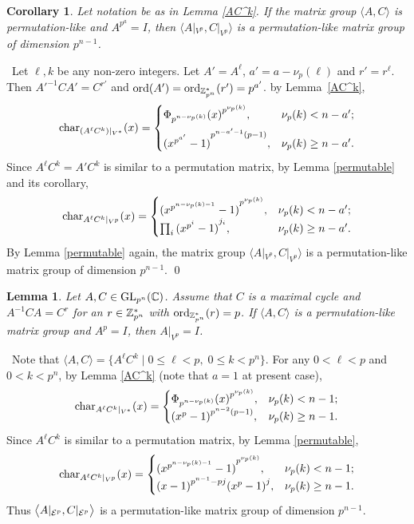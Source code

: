 \documentclass{article}
\newtheorem{corollary}[theorem]{Corollary}
\newtheorem{lemma}[theorem]{Lemma}
\numberwithin{equation}{section}
\def\pf{\noindent{\bf Proof.}~}
\begin{document}
\begin{corollary}\label{V^p}
Let notation be as in Lemma \ref{AC^k}.
If the matrix group $\langle A,C\rangle$ is permutation-like
and $A^{p^a}=I$,  then $\big\langle A|_{V^p},C|_{V^p}\big\rangle$
is a permutation-like matrix group of dimension $p^{n-1}$.
\end{corollary}

\pf Let $\ell,k$ be any non-zero integers.
Let $A'=A^\ell$, $a'=a-\nu_p(\ell)$ and $r'=r^\ell$.
Then $A'^{-1}CA'=C^{r'}$ and
${\rm ord}(A')={\rm ord}_{{\Bbb Z}_{p^n}^*}(r')=p^{a'}$.
by Lemma~\ref{AC^k},
$${\rm char}_{(A^\ell C^k)|_{V^*}}(x)
=\begin{cases}{\Phi_{p^{n-\nu_p(k)}}(x)}^{p^{\nu_p(k)}}, & \nu_p(k)<n-a';\\[5pt]
 {(x^{p^{a'}}-1)}^{p^{n-a'-1}(p-1)}, &  \nu_p(k)\ge n-a'. \end{cases}
$$
Since $A^\ell C^k=A'C^k$ is similar to a permutation matrix,
by Lemma \ref{permutable} and its corollary,
$$
{\rm char}_{A^\ell C^k|_{V^p}}(x)=\begin{cases}
{(x^{p^{n-\nu_p(k)-1}}-1)}^{p^{\nu_p(k)}}, & \nu_p(k)<n-a';\\
\prod_{i}{(x^{p^i}-1)}^{j_i}, & \nu_p(k)\ge n-a'.
\end{cases}
$$
By Lemma \ref{permutable} again, the matrix group
$\big\langle A|_{V^p},C|_{V^p}\big\rangle$
is a permutation-like matrix group of dimension $p^{n-1}$.
\qed


\begin{lemma} \label{A V^p}
Let $A,C\in{\rm GL}_{p^n}({\Bbb C})$.
Assume that $C$ is a maximal cycle and
$A^{-1}CA=C^r$ for an $r\in{\Bbb Z}_{p^n}^*$
with ${\rm ord}_{{\Bbb Z}_{p^{n}}^*}(r)=p$.
If $\langle A,C\rangle$ is a permutation-like matrix group and $A^{p}=I$,
then $A|_{V^p}=I$.
\end{lemma}


\pf Note that $\langle A,C\rangle=\{A^\ell C^k\mid 0\le\ell<p,\;0\le k<p^n\}$.
For any $0<\ell<p$ and $0<k<p^n$, by Lemma \ref{AC^k}
(note that $a=1$ at present case),
$$
{\rm char}_{A^\ell C^k|_{V^*}}(x)=\begin{cases}
{\Phi_{p^{n-\nu_p(k)}}(x)}^{p^{\nu_p(k)}}, & \nu_p(k)<n-1;\\
{(x^p-1)}^{p^{n-2}(p-1)}, & \nu_p(k)\ge n-1.
\end{cases}
$$
Since $A^\ell C^k$ is similar to a permutation matrix, by Lemma \ref{permutable},
\begin{equation}\label{A^p=I}
{\rm char}_{A^\ell C^k|_{V^p}}(x)=\begin{cases}
{(x^{p^{n-\nu_p(k)-1}}-1)}^{p^{\nu_p(k)}}, & \nu_p(k)<n-1;\\
{(x-1)}^{p^{n-1}-pj}{(x^p-1)}^{j}, & \nu_p(k)\ge n-1.
\end{cases}
\end{equation}
Thus $\big\langle A|_{{\cal E}^p},C|_{{\cal E}^p}\big\rangle$
is a permutation-like matrix group of dimension $p^{n-1}$.
\end{document}
